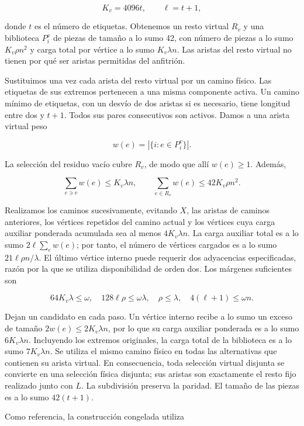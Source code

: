 \documentclass[spanish,11pt,a4paper]{article}
\begin{document}
\[K_v=4096t,\qquad \ell=t+1,\]

donde \(t\) es el número de etiquetas. Obtenemos un resto virtual \(R_v\) y una biblioteca \(P_i^v\) de piezas de tamaño a lo sumo 42, con número de piezas a lo sumo \(K_v\rho n^2\) y carga total por vértice a lo sumo \(K_v\lambda n\). Las aristas del resto virtual no tienen por qué ser aristas permitidas del anfitrión.

Sustituimos una vez cada arista del resto virtual por un camino físico. Las etiquetas de sus extremos pertenecen a una misma componente activa. Un camino mínimo de etiquetas, con un desvío de dos aristas si es necesario, tiene longitud entre dos y \(t+1\). Todos sus pares consecutivos son activos. Damos a una arista virtual peso

\[w(e)=|\{i:e\in P_i^v\}|.
\tag{B.3.3}\]

La selección del residuo vacío cubre \(R_v\), de modo que allí \(w(e)\ge1\). Además,

\[\sum_{e\ni v}w(e)\le K_v\lambda n,
\qquad \sum_{e\in R_v}w(e)\le42K_v\rho n^2.
\tag{B.3.4}\]

Realizamos los caminos sucesivamente, evitando \(X\), las aristas de caminos anteriores, los vértices repetidos del camino actual y los vértices cuya carga auxiliar ponderada acumulada sea al menos \(4K_v\lambda n\). La carga auxiliar total es a lo sumo \(2\ell\sum_e w(e)\); por tanto, el número de vértices cargados es a lo sumo \(21\ell\rho n/\lambda\). El último vértice interno puede requerir dos adyacencias especificadas, razón por la que se utiliza disponibilidad de orden dos. Los márgenes suficientes son

\[64K_v\lambda\le\omega,\quad
128\ell\rho\le\omega\lambda,\quad
\rho\le\lambda,\quad4(\ell+1)\le\omega n.
\tag{B.3.5}\]

Dejan un candidato en cada paso. Un vértice interno recibe a lo sumo un exceso de tamaño \(2w(e)\le2K_v\lambda n\), por lo que su carga auxiliar ponderada es a lo sumo \(6K_v\lambda n\). Incluyendo los extremos originales, la carga total de la biblioteca es a lo sumo \(7K_v\lambda n\). Se utiliza el mismo camino físico en todas las alternativas que contienen su arista virtual. En consecuencia, toda selección virtual disjunta se convierte en una selección física disjunta; sus aristas son exactamente el resto fijo realizado junto con \(L\). La subdivisión preserva la paridad. El tamaño de las piezas es a lo sumo \(42(t+1)\).

Como referencia, la construcción congelada utiliza
\end{document}
